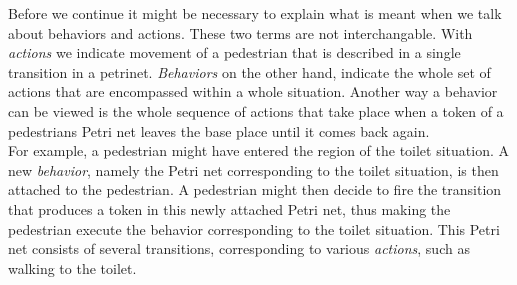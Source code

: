 \documentclass[11pt]{book}
\begin{document}
Before we continue it might be necessary to explain what is meant when we talk about behaviors and actions. These two terms are not interchangable. With \emph{actions} we indicate movement of a pedestrian that is described in a single transition in a petrinet. \emph{Behaviors} on the other hand, indicate the whole set of actions that are encompassed within a whole situation. Another way a behavior can be viewed is the whole sequence of actions that take place when a token of a pedestrians Petri net leaves the base place until it comes back again. \\
For example, a pedestrian might have entered the region of the toilet situation. A new \emph{behavior}, namely the Petri net corresponding to the toilet situation, is then attached to the pedestrian. A pedestrian might then decide to fire the transition that produces a token in this newly attached Petri net, thus making the pedestrian execute the behavior corresponding to the toilet situation. This Petri net consists of several transitions, corresponding to various \emph{actions}, such as walking to the toilet.
\end{document}
